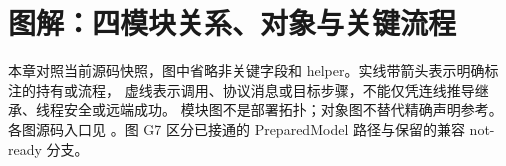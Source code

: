 \clearpage
\section{图解：四模块关系、对象与关键流程}
\label{sec:current-diagrams}
本章对照当前源码快照，图中省略非关键字段和 helper。实线带箭头表示明确标注的持有或流程，
虚线表示调用、协议消息或目标步骤，不能仅凭连线推导继承、线程安全或远端成功。
模块图不是部署拓扑；对象图不替代精确声明参考。各图源码入口见
。图 G7 区分已接通的 PreparedModel 路径与保留的兼容 not-ready 分支。










